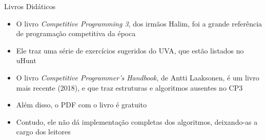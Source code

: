 \begin{frame}[fragile]{Livros Didáticos}

    \begin{itemize}
        \item O livro \textit{Competitive Programming 3}, dos irmãos Halim, foi a grande
            referência de programação competitiva da época

        \item Ele traz uma série de exercícios sugeridos do UVA, que estão listados no uHunt

        \item O livro \textit{Competitive Programmer's Handbook}, de Antti Laaksonen, é um
            livro mais recente (2018), e que traz estruturas e algoritmos ausentes no CP3

        \item Além disso, o PDF com o livro é gratuito

        \item Contudo, ele não dá implementação completas dos algoritmos, deixando-as a cargo
            dos leitores
    \end{itemize}

\end{frame}
